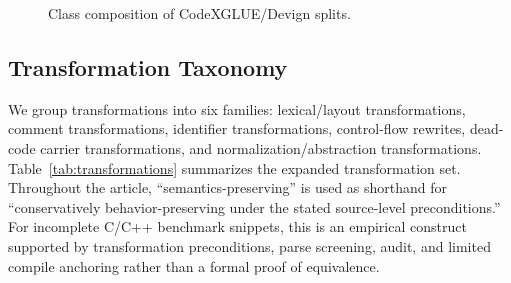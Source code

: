 \documentclass[a4paper,fleqn]{cas-dc}
\begin{document}
\begin{figure}
  \centering
  \resizebox{\columnwidth}{!}{}
  \caption{Class composition of CodeXGLUE/Devign splits.}
  \label{fig:dataset-composition}
\end{figure}

\subsection{Transformation Taxonomy}

We group transformations into six families: lexical/layout transformations,
comment transformations, identifier transformations, control-flow rewrites,
dead-code carrier transformations, and normalization/abstraction
transformations. Table~\ref{tab:transformations} summarizes the expanded
transformation set.
Throughout the article, ``semantics-preserving'' is used as shorthand for
``conservatively behavior-preserving under the stated source-level
preconditions.'' For incomplete C/C++ benchmark snippets, this is an empirical
construct supported by transformation preconditions, parse screening, audit,
and limited compile anchoring rather than a formal proof of equivalence.

\begin{table}[t]
  \centering
  \caption{Transformation taxonomy and observed applicability on the CodeXGLUE/Devign test split.}
  \label{tab:transformations}
\end{table}
\end{document}
